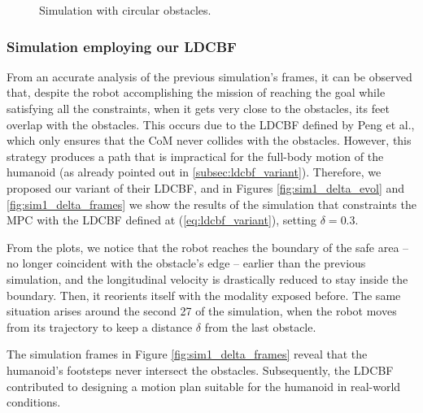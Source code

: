 \begin{figure}[H]
\begin{subfigure}{0.35\textwidth}
    \end{subfigure}
    \caption[short]{Simulation with circular obstacles.}
    \label{fig:sim1_frames}
\end{figure}
\thispagestyle{empty}

\subsubsection{Simulation employing our LDCBF}
From an accurate analysis of the previous simulation's frames, it can be observed that, despite the robot accomplishing the mission of reaching the goal while satisfying all the constraints, when it gets very close to the obstacles, its feet overlap with the obstacles. This occurs due to the LDCBF defined by Peng et al., which only ensures that the CoM never collides with the obstacles. However, this strategy produces a path that is impractical for the full-body motion of the humanoid (as already pointed out in \ref{subsec:ldcbf_variant}). Therefore, we proposed our variant of their LDCBF, and in Figures \ref{fig:sim1_delta_evol} and \ref{fig:sim1_delta_frames} we show the results of the simulation that constraints the MPC with the LDCBF defined at (\ref{eq:ldcbf_variant}), setting $\delta=0.3$.

From the plots, we notice that the robot reaches the boundary of the safe area -- no longer coincident with the obstacle's edge -- earlier than the previous simulation, and the longitudinal velocity is drastically reduced to stay inside the boundary. Then, it reorients itself with the modality exposed before. The same situation arises around the second 27 of the simulation, when the robot moves from its trajectory to keep a distance $\delta$ from the last obstacle.

The simulation frames in Figure \ref{fig:sim1_delta_frames} reveal that the humanoid's footsteps never intersect the obstacles. Subsequently, the LDCBF contributed to designing a motion plan suitable for the humanoid in real-world conditions.

